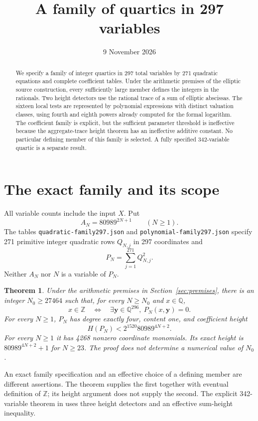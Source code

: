 \documentclass[11pt,a4paper]{article}
\title{A family of quartics in 297 variables}
\author{}\date{9 November 2026}
\newtheorem{theorem}{Theorem}[section]
\theoremstyle{remark}\newtheorem{remark}[theorem]{Remark}
\newcommand{\Q}{\mathbb Q}\newcommand{\Z}{\mathbb Z}\newcommand{\HH}{\mathcal H}
\begin{document}
\maketitle
\begin{abstract}
We specify a family of integer quartics in 297 total variables by 271
quadratic equations and complete coefficient tables. Under the arithmetic
premises of the elliptic source construction, every sufficiently large
member defines the integers in the rationals. Two height detectors use
the rational trace of a sum of elliptic abscissas. The sixteen local tests
are represented by polynomial expressions with distinct valuation classes,
using fourth and eighth powers already computed for the formal logarithm.
The coefficient family is explicit, but the sufficient parameter threshold
is ineffective because the aggregate-trace height theorem has an
ineffective additive constant. No particular defining member of this
family is selected. A fully specified 342-variable quartic is a separate
result.
\end{abstract}

\section{The exact family and its scope}
All variable counts include the input $X$. Put
\[
                     A_N=80989^{2N+1}\qquad(N\ge1).
\]
The tables \nolinkurl{quadratic-family297.json} and
\nolinkurl{polynomial-family297.json} specify 271 primitive integer
quadratic rows $Q_{N,j}$ in 297 coordinates and
\[
                           P_N=\sum_{j=1}^{271}Q_{N,j}^2.
\]
Neither $A_N$ nor $N$ is a variable of $P_N$.

\begin{theorem}\label{thm:main}
Under the arithmetic premises in Section~\ref{sec:premises}, there is
an integer $N_0\ge27464$ such that, for every $N\ge N_0$ and $x\in\Q$,
\[
 x\in\Z\quad\Longleftrightarrow\quad
 \exists\boldsymbol y\in\Q^{296},\ P_N(x,\boldsymbol y)=0.
\]
For every $N\ge1$, $P_N$ has degree exactly four, content one, and
coefficient height
\[
                           H(P_N)<2^{1520}80989^{4N+2}.
\]
For every $N\ge1$ it has 4268 nonzero coordinate monomials.
Its exact height is $80989^{4N+2}+1$ for $N\ge23$.
The proof does not determine a numerical value of $N_0$.
\end{theorem}

An exact family specification and an effective choice of a defining
member are different assertions. The theorem supplies the first together
with eventual definition of $\Z$; its height argument does not supply
the second. The explicit 342-variable theorem in \cite{Explicit} uses
three height detectors and an effective sum-height inequality.
\end{document}
